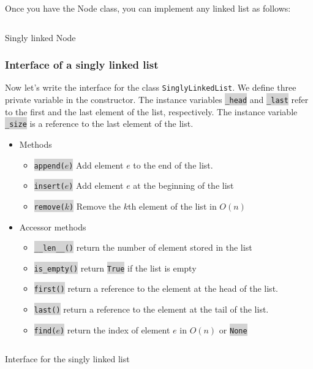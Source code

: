 \documentclass[10pt]{article}
\newcommand{\code}[1]{{\small\colorbox{LightGray}{\texttt{#1}}}}
\begin{document}
Once you have the Node class, you can implement any linked list as follows:
\begin{listing}[ht]
	\inputminted[bgcolor=LightGray]{python}{unit_testing_node.py}
	\caption{Singly linked Node}
	\label{listing:singlyLinkedNode}
\end{listing}

\subsubsection{Interface of a singly linked list}

Now let's write the interface for the class \texttt{SinglyLinkedList}. We define three private variable in the constructor. The instance variables \code{\_head} and \code{\_last} refer to the first and the last element of the list, respectively. The instance variable \code{\_size} is a reference to the last element of the list.     

\begin{itemize}
	\item Methods
	\begin{itemize}
		\item[] \code{append($e$)} Add element $e$ to the end of the list.
		\item[] \code{insert($e$)} Add element $e$ at the beginning of the list
		\item[] \code{remove($k$)} Remove the $k$th element of the list in $O(n)$
	\end{itemize}
	\item Accessor methods
	\begin{itemize}
		\item[] \code{\_\_len\_\_()} return the number of element stored in the list
		\item[] \code{is\_empty()} return \code{True} if the list is empty
		\item[] \code{first()} return a reference to the element at the head of the list.
		\item[] \code{last()} return a reference to the element at the tail of the list.
		\item[] \code{find($e$)} return the index of element $e$ in $O(n)$ or \code{None} 
	\end{itemize}		
\end{itemize}

\begin{listing}[ht]
	\inputminted[bgcolor=LightGray]{python}{singly_linked_list_interface.py}
	\caption{Interface for the singly linked list}
	\label{listing:singly_linked_list_interface}
\end{listing}
\end{document}
